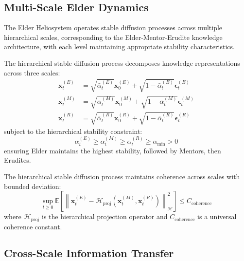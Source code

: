\subsection{Multi-Scale Elder Dynamics}

The Elder Heliosystem operates stable diffusion processes across multiple hierarchical scales, corresponding to the Elder-Mentor-Erudite knowledge architecture, with each level maintaining appropriate stability characteristics.

\begin{definition}
The hierarchical stable diffusion process decomposes knowledge representations across three scales:
\begin{align}
\mathbf{x}_t^{(E)} &= \sqrt{\bar{\alpha}_t^{(E)}} \mathbf{x}_0^{(E)} + \sqrt{1-\bar{\alpha}_t^{(E)}} \boldsymbol{\epsilon}_t^{(E)} \\
\mathbf{x}_t^{(M)} &= \sqrt{\bar{\alpha}_t^{(M)}} \mathbf{x}_0^{(M)} + \sqrt{1-\bar{\alpha}_t^{(M)}} \boldsymbol{\epsilon}_t^{(M)} \\
\mathbf{x}_t^{(R)} &= \sqrt{\bar{\alpha}_t^{(R)}} \mathbf{x}_0^{(R)} + \sqrt{1-\bar{\alpha}_t^{(R)}} \boldsymbol{\epsilon}_t^{(R)}
\end{align}
subject to the hierarchical stability constraint:
\begin{equation}
\bar{\alpha}_t^{(E)} \geq \bar{\alpha}_t^{(M)} \geq \bar{\alpha}_t^{(R)} \geq \alpha_{\text{min}} > 0
\end{equation}
ensuring Elder maintains the highest stability, followed by Mentors, then Erudites.
\end{definition}

\begin{theorem}
The hierarchical stable diffusion process maintains coherence across scales with bounded deviation:
\begin{equation}
\sup_{t \geq 0} \mathbb{E}\left[\left\|\mathbf{x}_t^{(E)} - \mathcal{H}_{\text{proj}}(\mathbf{x}_t^{(M)}, \mathbf{x}_t^{(R)})\right\|_{\mathcal{H}}^2\right] \leq C_{\text{coherence}}
\end{equation}
where $\mathcal{H}_{\text{proj}}$ is the hierarchical projection operator and $C_{\text{coherence}}$ is a universal coherence constant.
\end{theorem}

\subsection{Cross-Scale Information Transfer}

